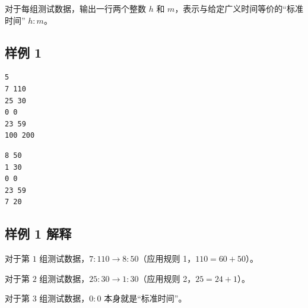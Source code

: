 对于每组测试数据，输出一行两个整数 $h$ 和 $m$，表示与给定广义时间等价的``标准时间'' $h{:}m$。

\subsection{样例 1}

\begin{minipage}{\linewidth}
	\begin{minipage}[t]{0.49\linewidth}
		\begin{lstlisting}[title=\texttt{standard input}]
5
7 110
25 30
0 0
23 59
100 200
\end{lstlisting}
	\end{minipage}
	\begin{minipage}[t]{0.49\linewidth}
		\begin{lstlisting}[title=\texttt{standard output}]
8 50
1 30
0 0
23 59
7 20
\end{lstlisting}
	\end{minipage}
\end{minipage}


\subsection{样例 1 解释}

对于第 $1$ 组测试数据，$7{:}110 \to 8{:}50$（应用规则 1，$110 = 60 + 50$）。

对于第 $2$ 组测试数据，$25{:}30 \to 1{:}30$（应用规则 2，$25 = 24 + 1$）。

对于第 $3$ 组测试数据，$0{:}0$ 本身就是``标准时间''。

